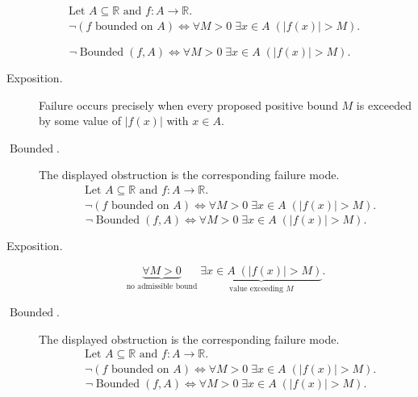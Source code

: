 \begin{remark*}
\[
\begin{aligned}
&\text{Let } A \subseteq \mathbb{R} \text{ and } f \colon A \to \mathbb{R}.\\
&\neg(f \text{ bounded on } A)
\Longleftrightarrow
\forall M>0 \; \exists x \in A \; (|f(x)| > M).
\end{aligned}
\]
\end{remark*}

\begin{remark*}
\[
\neg \operatorname{Bounded}(f,A) \Longleftrightarrow \forall M>0 \; \exists x \in A \; (|f(x)| > M).
\]
\end{remark*}

\begin{remark*}
\begin{description}
  \item[Exposition.]
Failure occurs precisely when every proposed positive bound $M$ is exceeded by some value of $|f(x)|$ with $x \in A$.


  \item[\(\operatorname{Bounded}.\)]
  The displayed obstruction is the corresponding failure mode.
  \[
\begin{aligned}
&\text{Let } A \subseteq \mathbb{R} \text{ and } f \colon A \to \mathbb{R}.\\
&\neg(f \text{ bounded on } A)
\Longleftrightarrow
\forall M>0 \; \exists x \in A \; (|f(x)| > M).
\end{aligned}
  \]
  \[
\neg \operatorname{Bounded}(f,A) \Longleftrightarrow \forall M>0 \; \exists x \in A \; (|f(x)| > M).
  \]
\end{description}
\end{remark*}

\begin{remark*}
\begin{description}
  \item[Exposition.]
\[
\underbrace{\forall M>0}_{\text{no admissible bound}}
\; \underbrace{\exists x \in A \; (|f(x)| > M)}_{\text{value exceeding } M}.
\]


  \item[\(\operatorname{Bounded}.\)]
  The displayed obstruction is the corresponding failure mode.
  \[
\begin{aligned}
&\text{Let } A \subseteq \mathbb{R} \text{ and } f \colon A \to \mathbb{R}.\\
&\neg(f \text{ bounded on } A)
\Longleftrightarrow
\forall M>0 \; \exists x \in A \; (|f(x)| > M).
\end{aligned}
  \]
  \[
\neg \operatorname{Bounded}(f,A) \Longleftrightarrow \forall M>0 \; \exists x \in A \; (|f(x)| > M).
  \]
\end{description}
\end{remark*}





